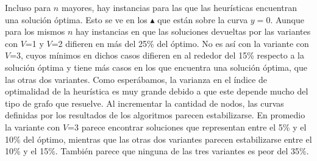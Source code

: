 \par{Incluso para $n$ mayores, hay instancias para las que las
heurísticas encuentran una solución óptima. Esto se ve en los $\blacktriangle$
que están sobre la curva $y=0$. Aunque para los mismos $n$ hay instancias en
que las soluciones devueltas por las variantes con $V$=1 y $V$=2 difieren en
más del 25\% del óptimo. No es así con la variante con $V$=3, cuyos mínimos en
dichos casos difieren en al rededor del 15\% respecto a la solución óptima y tiene
más casos en los que encuentra una solución óptima, que las otras dos variantes.
Como esperábamos, la varianza en el índice de optimalidad de la heurística
es muy grande debido a que este depende mucho del tipo de grafo que resuelve.
Al incrementar la cantidad de nodos, las curvas definidas por los resultados de
los algoritmos parecen estabilizarse. En promedio la variante con $V$=3 parece
encontrar soluciones que representan entre el 5\% y el 10\% del óptimo, mientras
que las otras dos variantes parecen estabilizarse entre el 10\% y el 15\%.
También parece que ninguna de las tres variantes es peor del 35\%.}
